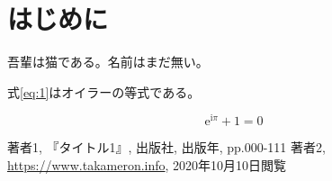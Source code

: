 

\section{はじめに}

吾輩は猫である。名前はまだ無い。 

式\ref{eq:1}はオイラーの等式である。

\begin{equation}
  \label{eq:1}
  \mathrm{e}^{\mathrm{i}\pi} + 1 = 0
\end{equation}


\begin{thebibliography}{9}
   著者1, 『タイトル1』, 出版社, 出版年, pp.000-111
   著者2, \url{https://www.takameron.info}, 2020年10月10日閲覧
\end{thebibliography}

